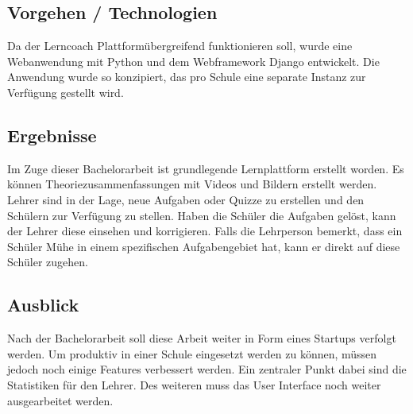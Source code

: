 

\subsection*{Vorgehen / Technologien}
Da der Lerncoach Plattformübergreifend funktionieren soll, wurde eine Webanwendung mit Python und dem Webframework Django entwickelt. Die Anwendung wurde so konzipiert, das pro Schule eine separate Instanz zur Verfügung gestellt wird.

\subsection*{Ergebnisse}
Im Zuge dieser Bachelorarbeit ist grundlegende Lernplattform erstellt worden. Es können Theoriezusammenfassungen mit Videos und Bildern erstellt werden. Lehrer sind in der Lage, neue Aufgaben oder Quizze zu erstellen und den Schülern zur Verfügung zu stellen. Haben die Schüler die Aufgaben gelöst, kann der Lehrer diese einsehen und korrigieren. Falls die Lehrperson bemerkt, dass ein Schüler Mühe in einem spezifischen Aufgabengebiet hat, kann er direkt auf diese Schüler zugehen.

\subsection*{Ausblick}
Nach der Bachelorarbeit soll diese Arbeit weiter in Form eines Startups verfolgt werden. Um produktiv in einer Schule eingesetzt werden zu können, müssen jedoch noch einige Features verbessert werden. Ein zentraler Punkt dabei sind die Statistiken für den Lehrer. Des weiteren muss das User Interface noch weiter ausgearbeitet werden.


\newpage